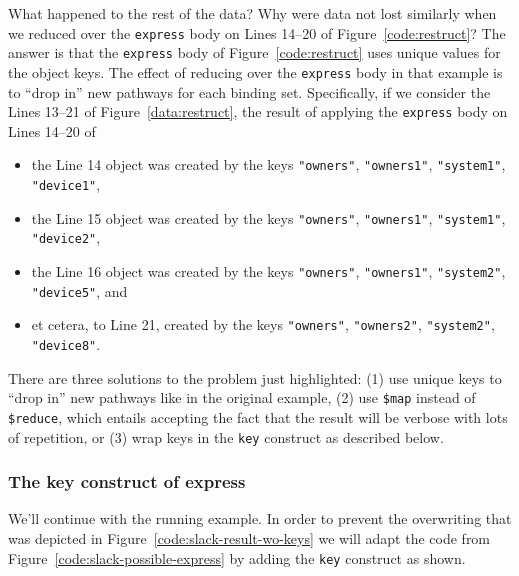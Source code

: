 \documentclass[10pt,letterpaper]{article} %
\newcommand{\stt}[1]{\texttt{#1}} %
\begin{document}
What happened to the rest of the data?
Why were data not lost similarly when we reduced over the \stt{express} body on Lines 14--20 of Figure~\ref{code:restruct}?
The answer is that the \stt{express} body of Figure~\ref{code:restruct} uses unique values for the object keys.
The effect of reducing over the \stt{express} body in that example is to ``drop in'' new pathways for each binding set.
Specifically, if we consider the Lines 13--21 of Figure~\ref{data:restruct}, the result of applying the \stt{express} body on Lines 14--20 of %

\begin{itemize}
\item the Line 14 object was created by the keys \stt{"owners"}, \stt{"owners1"}, \stt{"system1"}, \stt{"device1"},
\item the Line 15 object was created by the keys \stt{"owners"}, \stt{"owners1"}, \stt{"system1"}, \stt{"device2"},
\item the Line 16 object was created by the keys \stt{"owners"}, \stt{"owners1"}, \stt{"system2"}, \stt{"device5"}, and
\item et cetera, to Line 21, created by the keys \stt{"owners"}, \stt{"owners2"}, \stt{"system2"}, \stt{"device8"}.
\end{itemize}

There are three solutions to the problem just highlighted:
(1) use unique keys to ``drop in'' new pathways like in the original example,
(2) use \stt{\$map} instead of \stt{\$reduce}, which entails accepting the fact that the result will be verbose with lots of repetition, or
(3) wrap keys in the \stt{key} construct as described below.

\subsubsection{The key construct of express}

We'll continue with the running example.
In order to prevent the overwriting that was depicted in Figure~\ref{code:slack-result-wo-keys} we will
adapt the code from Figure~\ref{code:slack-possible-express} by adding the \stt{key} construct as shown.
\end{document}
